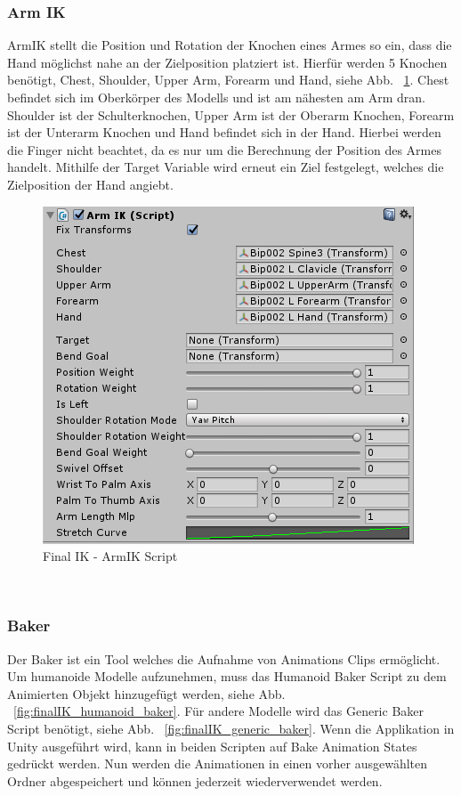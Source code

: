 \begin{itemize}
\subsubsection{Arm IK}
ArmIK stellt die Position und Rotation der Knochen eines Armes so ein, dass die Hand möglichst nahe an der Zielposition platziert ist.
Hierfür werden 5 Knochen benötigt, Chest, Shoulder, Upper Arm, Forearm und Hand, siehe Abb. ~\ref{fig:finalIK_armIK_script}.
Chest befindet sich im Oberkörper des Modells und ist am nähesten am Arm dran.
Shoulder ist der Schulterknochen, Upper Arm ist der Oberarm Knochen, Forearm ist der Unterarm Knochen und Hand befindet sich in der Hand.
Hierbei werden die Finger nicht beachtet, da es nur um die Berechnung der Position des Armes handelt.
Mithilfe der Target Variable wird erneut ein Ziel festgelegt, welches die Zielposition der Hand angiebt.
\begin {figure}
    \centering
    \includegraphics[scale=1]{pics/finalik_armik_script}
    \caption{Final IK - ArmIK Script}
    \label{fig:finalIK_armIK_script}
\end {figure}
~\cite{FinalIK_ArmIK_2021}

\subsubsection{Baker}
Der Baker ist ein Tool welches die Aufnahme von Animations Clips ermöglicht.
Um humanoide Modelle aufzunehmen, muss das Humanoid Baker Script zu dem Animierten Objekt hinzugefügt werden, siehe Abb. ~\ref{fig:finalIK_humanoid_baker}.
Für andere Modelle wird das Generic Baker Script benötigt, siehe Abb. ~\ref{fig:finalIK_generic_baker}.
Wenn die Applikation in Unity ausgeführt wird, kann in beiden Scripten auf Bake Animation States gedrückt werden.
Nun werden die Animationen in einen vorher ausgewählten Ordner abgespeichert und können jederzeit wiederverwendet werden.


\end{itemize}
